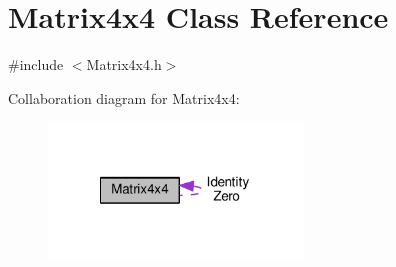 \hypertarget{class_matrix4x4}{\section{Matrix4x4 Class Reference}
\label{class_matrix4x4}
}


{\ttfamily \#include $<$Matrix4x4.\+h$>$}



Collaboration diagram for Matrix4x4\+:\nopagebreak
\begin{figure}[H]
\begin{center}
\leavevmode
\includegraphics[width=192pt]{class_matrix4x4__coll__graph}
\end{center}
\end{figure}

